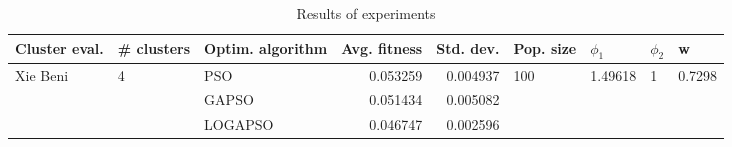 \begin{table}
\centering
\caption{Results of experiments}
\begin{tabular}{lllrrllll}
\toprule
            Cluster eval. &        \# clusters & Optim. algorithm &  Avg. fitness &  Std. dev. &            Pop. size &               $\phi_{1}$ &         $\phi_{2}$ &                       w \\
\midrule
\multirow{3}{*}{Xie Beni} & \multirow{3}{*}{4} &              PSO &      0.053259 &   0.004937 & \multirow{3}{*}{100} & \multirow{3}{*}{1.49618} & \multirow{3}{*}{1} & \multirow{3}{*}{0.7298} \\
                          &                    &            GAPSO &      0.051434 &   0.005082 &                      &                          &                    &                         \\
                          &                    &          LOGAPSO &      0.046747 &   0.002596 &                      &                          &                    &                         \\
\bottomrule
\end{tabular}
\end{table}
